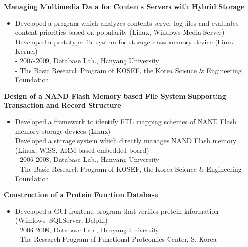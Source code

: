 \documentclass{res}
\begin{document}
\begin{resume}
  {\bf Managing Multimedia Data for Contents Servers with Hybrid Storage}
    \begin{itemize} %
      \item[] 
	Developed a program which analyzes contents server log files and
	evaluates content priorities based on popularity (Linux, Windows Media
	Server) \\
	Developed a prototype file system for storage class memory device
	(Linux Kernel) 
	\vspace{0.05in}\\
        - {\small 2007-2009, Database Lab., Hanyang University}\\
	- {\small The Basic Research Program of KOSEF, the Korea Science \& Engineering
	Foundation}
      \end{itemize}

  {\bf Design of a NAND Flash Memory based File System Supporting Transaction and
       Record Structure} 
        \begin{itemize}
        \item[]
	Developed a framework to identify FTL mapping schemes of NAND Flash
	memory storage devices (Linux)\\
	Developed a storage system which directly manages NAND Flash memory
	(Linux, WiSS, ARM-based embedded board)
	\vspace{0.05in}\\
	- {\small 2006-2008, Database Lab., Hanyang University}\\
	- {\small The Basic Research Program of KOSEF, the Korea Science \& Engineering
	Foundation}
       \end{itemize}

   {\bf Construction of a Protein Function Database} 
        \begin{itemize}
        \item[] 
        Developed a GUI frontend program that verifies protein information
	(Windows, SQLServer, Delphi)
	\vspace{0.05in}\\
	- {\small 2006-2008, Database Lab., Hanyang University}\\
	- {\small The Research Program of Functional Proteomics Center, S.
	Korea}
       \end{itemize} 
 

\end{resume}
\end{document}
